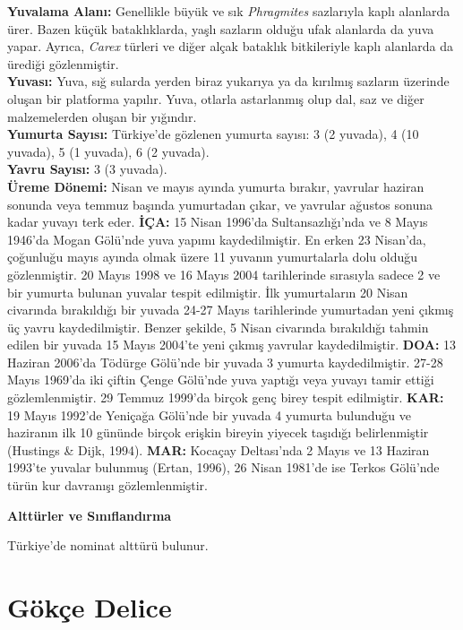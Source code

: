 \documentclass[
  a4paper,
  DIV=11,
  numbers=noendperiod]{scrreprt}
\begin{document}
\textbf{Yuvalama Alanı:} Genellikle büyük ve sık \emph{Phragmites}
sazlarıyla kaplı alanlarda ürer. Bazen küçük bataklıklarda, yaşlı
sazların olduğu ufak alanlarda da yuva yapar. Ayrıca, \emph{Carex}
türleri ve diğer alçak bataklık bitkileriyle kaplı alanlarda da ürediği
gözlenmiştir.\\
\textbf{Yuvası:} Yuva, sığ sularda yerden biraz yukarıya ya da kırılmış
sazların üzerinde oluşan bir platforma yapılır. Yuva, otlarla
astarlanmış olup dal, saz ve diğer malzemelerden oluşan bir yığındır.\\
\textbf{Yumurta Sayısı:} Türkiye'de gözlenen yumurta sayısı: 3 (2
yuvada), 4 (10 yuvada), 5 (1 yuvada), 6 (2 yuvada).\\
\textbf{Yavru Sayısı:} 3 (3 yuvada).\\
\textbf{Üreme Dönemi:} Nisan ve mayıs ayında yumurta bırakır, yavrular
haziran sonunda veya temmuz başında yumurtadan çıkar, ve yavrular
ağustos sonuna kadar yuvayı terk eder. \textbf{İÇA:} 15 Nisan 1996'da
Sultansazlığı'nda ve 8 Mayıs 1946'da Mogan Gölü'nde yuva yapımı
kaydedilmiştir. En erken 23 Nisan'da, çoğunluğu mayıs ayında olmak üzere
11 yuvanın yumurtalarla dolu olduğu gözlenmiştir. 20 Mayıs 1998 ve 16
Mayıs 2004 tarihlerinde sırasıyla sadece 2 ve bir yumurta bulunan
yuvalar tespit edilmiştir. İlk yumurtaların 20 Nisan civarında
bırakıldığı bir yuvada 24-27 Mayıs tarihlerinde yumurtadan yeni çıkmış
üç yavru kaydedilmiştir. Benzer şekilde, 5 Nisan civarında bırakıldığı
tahmin edilen bir yuvada 15 Mayıs 2004'te yeni çıkmış yavrular
kaydedilmiştir. \textbf{DOA:} 13 Haziran 2006'da Tödürge Gölü'nde bir
yuvada 3 yumurta kaydedilmiştir. 27-28 Mayıs 1969'da iki çiftin Çenge
Gölü'nde yuva yaptığı veya yuvayı tamir ettiği gözlemlenmiştir. 29
Temmuz 1999'da birçok genç birey tespit edilmiştir. \textbf{KAR:} 19
Mayıs 1992'de Yeniçağa Gölü'nde bir yuvada 4 yumurta bulunduğu ve
haziranın ilk 10 gününde birçok erişkin bireyin yiyecek taşıdığı
belirlenmiştir (Hustings \& Dijk, 1994). \textbf{MAR:} Kocaçay
Deltası'nda 2 Mayıs ve 13 Haziran 1993'te yuvalar bulunmuş (Ertan,
1996), 26 Nisan 1981'de ise Terkos Gölü'nde türün kur davranışı
gözlemlenmiştir.

\textbf{Alttürler ve Sınıflandırma}

Türkiye'de nominat alttürü bulunur.

\section{Gökçe Delice}\label{guxf6kuxe7e-delice}
\end{document}
